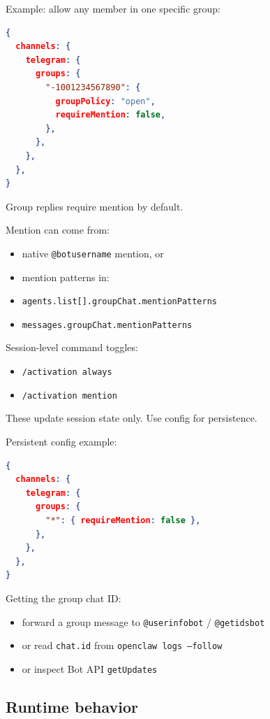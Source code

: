 Example: allow any member in one specific group:

\begin{lstlisting}[language=json]
{
  channels: {
    telegram: {
      groups: {
        "-1001234567890": {
          groupPolicy: "open",
          requireMention: false,
        },
      },
    },
  },
}
\end{lstlisting}



Group replies require mention by default.

Mention can come from:

\begin{itemize}
  \item native \texttt{@botusername} mention, or
  \item mention patterns in:
  \item \texttt{agents.list[].groupChat.mentionPatterns}
  \item \texttt{messages.groupChat.mentionPatterns}
\end{itemize}


Session-level command toggles:

\begin{itemize}
  \item \texttt{/activation always}
  \item \texttt{/activation mention}
\end{itemize}


These update session state only. Use config for persistence.

Persistent config example:

\begin{lstlisting}[language=json]
{
  channels: {
    telegram: {
      groups: {
        "*": { requireMention: false },
      },
    },
  },
}
\end{lstlisting}


Getting the group chat ID:

\begin{itemize}
  \item forward a group message to \texttt{@userinfobot} / \texttt{@getidsbot}
  \item or read \texttt{chat.id} from \texttt{openclaw logs --follow}
  \item or inspect Bot API \texttt{getUpdates}
\end{itemize}



\subsection{Runtime behavior}


